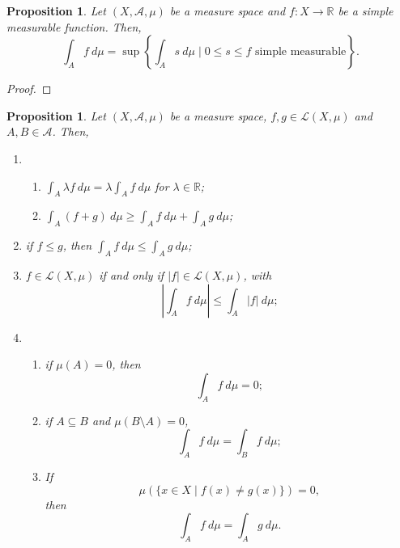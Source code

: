 \documentclass[a4paper, openany]{memoir}
\theoremstyle{definition}
\theoremstyle{plain}
\newtheorem{proposition}[definition]{Proposition}
\begin{document}
    \begin{proposition}
        Let $(X, \mathcal{A}, \mu)$ be a measure space and $f \colon X \to \mathbb{R}$ be a simple measurable function. Then,
        \[\int_A f \ d\mu = \sup \left\{\int_A s \ d\mu \mid 0 \leq s \leq f \text{ simple measurable} \right\}.\]
    \end{proposition}
    \begin{proof}
        
    \end{proof}

    \begin{proposition}
        Let $(X, \mathcal{A}, \mu)$ be a measure space, $f, g \in \mathcal{L}(X, \mu)$ and $A, B \in \mathcal{A}$. Then, 
        \begin{enumerate}
            \item \begin{enumerate}
                \item $\int_A \lambda f \ d\mu = \lambda \int_A f \ d\mu$ for $\lambda \in \mathbb{R}$;
                \item $\int_A (f + g) \ d\mu \geq \int_A f \ d\mu + \int_A g \ d\mu$;
            \end{enumerate}
            \item if $f \leq g$, then $\int_A f \ d\mu \leq \int_A g \ d\mu$;
            \item $f \in \mathcal{L}(X, \mu)$ if and only if $|f| \in \mathcal{L}(X, \mu)$, with
            \[\left|\int_A f \ d\mu\right| \leq \int_A |f| \ d\mu;\]
            \item \begin{enumerate}
                \item if $\mu(A) = 0$, then
                \[\int_A f \ d\mu = 0;\]
                \item if $A \subseteq B$ and $\mu(B \setminus A) = 0$,
                \[\int_A f \ d\mu = \int_B f \ d\mu;\]
                \item If 
                \[\mu (\{x \in X \mid f(x) \neq g(x)\}) = 0,\]
                then 
                \[\int_A f \ d\mu = \int_A g \ d\mu.\]
            \end{enumerate}
        \end{enumerate}
    \end{proposition}
\end{document}
